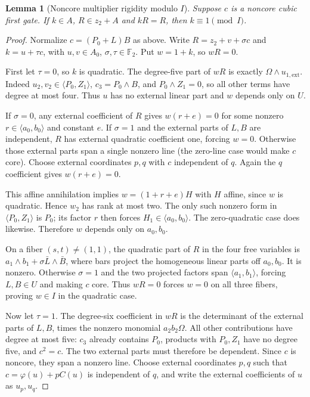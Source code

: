 \documentclass[11pt,a4paper]{article}
\theoremstyle{plain}
\newtheorem{lemma}[theorem]{Lemma}
\theoremstyle{remark}
\begin{document}
\begin{lemma}[Noncore multiplier rigidity modulo $I$]\label{l1:lem:noncoremult}
Suppose $c$ is a noncore cubic first gate. If $k\in A$, $R\in z_2+A$ and $kR=R$, then $k\equiv1\pmod I$.
\end{lemma}
\begin{proof}
Normalize $c=(P_0+L)B$ as above. Write $R=z_2+v+\sigma c$ and $k=u+\tau c$, with $u,v\in A_0$, $\sigma,\tau\in\mathbb F_2$. Put $w=1+k$, so $wR=0$.

First let $\tau=0$, so $k$ is quadratic. The degree-five part of $wR$ is exactly $\Omega\wedge u_{1,\mathrm{ext}}$. Indeed $u_2,v_2\in\langle P_0,Z_1\rangle$, $c_3=P_0\wedge B$, and $P_0\wedge Z_1=0$, so all other terms have degree at most four. Thus $u$ has no external linear part and $w$ depends only on $U$.

If $\sigma=0$, any external coefficient of $R$ gives $w(r+e)=0$ for some nonzero $r\in\langle a_0,b_0\rangle$ and constant $e$. If $\sigma=1$ and the external parts of $L,B$ are independent, $R$ has external quadratic coefficient one, forcing $w=0$. Otherwise those external parts span a single nonzero line (the zero-line case would make $c$ core). Choose external coordinates $p,q$ with $c$ independent of $q$. Again the $q$ coefficient gives $w(r+e)=0$.

This affine annihilation implies $w=(1+r+e)H$ with $H$ affine, since $w$ is quadratic. Hence $w_2$ has rank at most two. The only such nonzero form in $\langle P_0,Z_1\rangle$ is $P_0$; its factor $r$ then forces $H_1\in\langle a_0,b_0\rangle$. The zero-quadratic case does likewise. Therefore $w$ depends only on $a_0,b_0$.

On a fiber $(s,t)\ne(1,1)$, the quadratic part of $R$ in the four free variables is $a_1\wedge b_1+\sigma\bar L\wedge\bar B$, where bars project the homogeneous linear parts off $a_0,b_0$. It is nonzero. Otherwise $\sigma=1$ and the two projected factors span $\langle a_1,b_1\rangle$, forcing $L,B\in U$ and making $c$ core. Thus $wR=0$ forces $w=0$ on all three fibers, proving $w\in I$ in the quadratic case.

Now let $\tau=1$. The degree-six coefficient in $wR$ is the determinant of the external parts of $L,B$, times the nonzero monomial $a_2b_2\Omega$. All other contributions have degree at most five: $c_3$ already contains $P_0$, products with $P_0,Z_1$ have no degree five, and $c^2=c$. The two external parts must therefore be dependent. Since $c$ is noncore, they span a nonzero line. Choose external coordinates $p,q$ such that $c=\varphi(u)+pC(u)$ is independent of $q$, and write the external coefficients of $u$ as $u_p,u_q$.


\end{proof}
\end{document}
